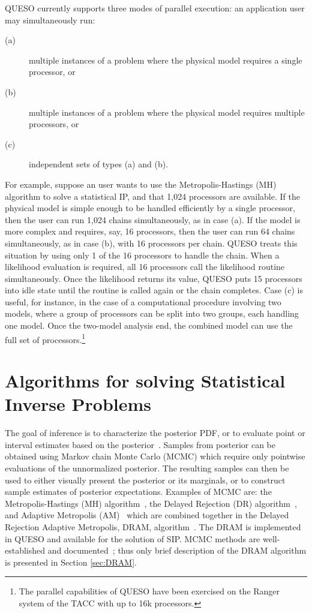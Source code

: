 QUESO currently supports three modes of parallel execution:
an application user may simultaneously run:
\begin{description}
\item[(a)] multiple instances of a problem where the physical model requires a single processor, or
\item[(b)] multiple instances of a problem where the physical model requires multiple processors, or
\item[(c)] independent sets of types (a) and (b).
\end{description}

For example, suppose an user wants to use the Metropolis-Hastings (MH) algorithm to solve a statistical IP, and that 1,024 processors are available.
If the physical model is simple enough to be handled efficiently by a single processor, then the user can run 1,024 chains simultaneously, as in case (a).
If the model is more complex and requires, say, 16 processors, then the user can run 64 chains simultaneously, as in case (b), with 16 processors per chain.
QUESO treats this situation by using only 1 of the 16 processors to handle the chain.
When a likelihood evaluation is required, all 16 processors call the likelihood routine simultaneously.
Once the likelihood returns its value, QUESO puts  15 processors into idle state until the routine is called again or the chain completes.
Case (c) is useful, for instance, in the case of a computational procedure involving two models,
where a group of processors can be split into two groups, each handling one model.
Once the two-model analysis end, the combined model can use the full set of processors.\footnote{The parallel capabilities of QUESO have been exercised on the Ranger system of the TACC \cite{tacc} with up to 16k processors.}



\section{Algorithms for solving Statistical Inverse Problems}

The goal of inference is to characterize the posterior PDF, or to evaluate point or interval estimates based on the posterior~\cite{HuMa01}.
Samples from posterior can be obtained using Markov chain Monte Carlo (MCMC) which require only pointwise evaluations of the unnormalized posterior.
The resulting samples can then be used to either visually present the posterior or its marginals, or to construct sample estimates of posterior expectations.
Examples of MCMC are: the Metropolis-Hastings (MH) algorithm~\cite{Metr_1953,Hast_1970}, the Delayed Rejection (DR) algorithm~\cite{GrMi01,Mira01}, and
Adaptive Metropolis (AM)~\cite{HaSaTa01} which are combined together in the Delayed Rejection Adaptive Metropolis, DRAM,  algorithm~\cite{HaLaMiSa06}. The DRAM is implemented in QUESO and available for the solution of SIP. MCMC methods are well-established and documented~\cite{CaSo07,GrMi01,HaLaMiSa06,HaSaTa01,Hast_1970,KaSo05,Laine08,Metr_1953,Mira01}; thus only brief description of the DRAM algorithm is presented in Section \ref{sec:DRAM}. 


